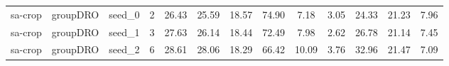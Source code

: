 \documentclass[11pt]{article}
\begin{document}
\begin{table}[h!]
{\begin{tabular}{lllcccccccccc}
sa-crop & groupDRO & seed\_0 & 2 & 26.43 & 25.59 & 18.57 & 74.90 & 7.18 & 3.05 & 24.33 & 21.23 & 7.96 \\
sa-crop & groupDRO & seed\_1 & 3 & 27.63 & 26.14 & 18.44 & 72.49 & 7.98 & 2.62 & 26.78 & 21.14 & 7.45 \\
sa-crop & groupDRO & seed\_2 & 6 & 28.61 & 28.06 & 18.29 & 66.42 & 10.09 & 3.76 & 32.96 & 21.47 & 7.09 \\

\bottomrule
\end{tabular}%
}
\end{table}



\end{document}
